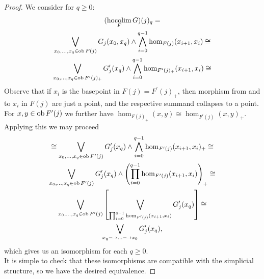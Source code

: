     \begin{proof}
      We consider for $q \geq 0$:
      \begin{gather*}
        (\hocolim_F G)(j)_q = \\%
        \bigvee_{x_0, \ldots, x_q \in \ob F(j)} %
          G_j(x_0,x_q) \wedge \bigwedge_{i=0}^{q-1} \hom_{F(j)}(x_{i+1},x_i) \cong \\%
        \bigvee_{x_0, \ldots, x_q \in \ob F^\prime(j)_+} %
          G^\prime_j(x_q) \wedge \bigwedge_{i=0}^{q-1} %
          \hom_{F^\prime(j)_+}(x_{i+1},x_i) \cong %
      \end{gather*}
      Observe that if $x_i$ is the basepoint in $F(j) = F^\prime(j)_+$, then
      morphism from and to $x_i$ in $F(j)$ are just a point, and the respective
      summand collapses to a point. For $x, y \in \operatorname{ob} F^\prime(j)$ we further
      have $\hom_{F(j)_+}(x,y) \cong \hom_{F^\prime(j)}(x,y)_+$. Applying this
      we may proceed
      \begin{gather*}
        \cong \bigvee_{x_0, \ldots, x_q \in \ob F^\prime(j)} %
          G^\prime_j(x_q) \wedge \bigwedge_{i=0}^{q-1}
          \hom_{F^\prime(j)}(x_{i+1},x_i)_+ \cong \\%
        \bigvee_{x_0, \ldots, x_q \in \ob F^\prime(j)} %
          G^\prime_j(x_q) \wedge %
          \left (\prod_{i=0}^{q-1} \hom_{F^\prime(j)}(x_{i+1},x_i) \right)_+
          \cong \\%
        \bigvee_{x_0, \ldots, x_q \in \ob F^\prime(j)} \left[%
          \bigvee_{\prod_{i=0}^{q-1} \hom_{F^\prime(j)}(x_{i+1},x_i)} %
          G^\prime_j(x_q) \right] \cong \\%
          \bigvee_{x_q \to \ldots \to x_0} G^\prime_j(x_q),
      \end{gather*}
      which gives us an isomorphism for each $q \geq 0$.\\
      It is simple to check that these isomorphisms are compatible with the
      simplicial structure, so we have the desired equivalence.
    \end{proof}
